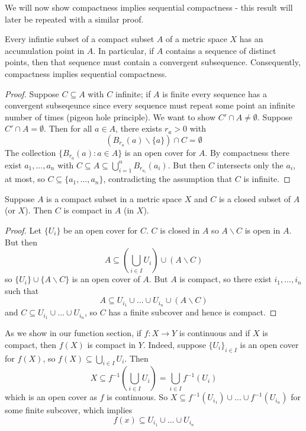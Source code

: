 We will now show compactness implies sequential compactness - this result will later be repeated with a similar proof.

\begin{proposition}
    Every infintie subset of a compact subset $A$ of a metric space $X$ has an accumulation point in $A$. In particular, if $A$ contains a sequence of distinct points, then that sequence must contain a convergent subsequence. Consequently, compactness implies sequential compactness.
\end{proposition}
\begin{proof}
    Suppose $C \subseteq A$ with $C$ infinite; if $A$ is finite every sequence has a convergent subseqeunce since every sequence must repeat some point an infinite number of times (pigeon hole principle). We want to show $C'\cap A \neq \emptyset$. Suppose $C'\cap A = \emptyset$. Then for all $a \in A$, there exists $r_a > 0$ with $$(B_{r_a}(a)\backslash\{a\})\cap C = \emptyset$$ The collection $\{B_{r_a}(a):a \in A\}$ is an open cover for $A$. By compactness there exist $a_1,...,a_n$ with $C \subseteq A \subseteq \bigcup_{i=1}^nB_{r_{a_i}}(a_i)$. But then $C$ intersects only the $a_i$, at most, so $C \subseteq \{a_1,...,a_n\}$, contradicting the assumption that $C$ is infinite.
\end{proof}

\begin{proposition}
    Suppose $A$ is a compact subset in a metric space $X$ and $C$ is a closed subset of $A$ (or $X$). Then $C$ is compact in $A$ (in $X$).
\end{proposition}
\begin{proof}
    Let $\{U_i\}$ be an open cover for $C$. $C$ is closed in $A$ so $A \backslash C$ is open in $A$. But then $$A \subseteq \left(\bigcup_{i \in I}U_i\right)\cup\left(A\backslash C\right)$$ so $\{U_i\}\cup\{A\backslash C\}$ is an open cover of $A$. But $A$ is compact, so there exist $i_1,...,i_n$ such that $$A \subseteq U_{i_1}\cup...\cup U_{i_n}\cup(A\backslash C)$$ and $C \subseteq U_{i_1}\cup ... \cup U_{i_n}$, so $C$ has a finite subcover and hence is compact.
\end{proof}

\begin{example}
    As we show in our function section, if $f:X\rightarrow Y$ is continuous and if $X$ is compact, then $f(X)$ is compact in $Y$. Indeed, suppose $\{U_i\}_{i \in I}$ is an open cover for $f(X)$, so $f(X) \subseteq \bigcup_{i \in I}U_i$. Then $$X \subseteq f^{-1}\left(\bigcup_{i \in I}U_i\right) = \bigcup_{i \in I}f^{-1}(U_i)$$ which is an open cover as $f$ is continuous. So $X \subseteq f^{-1}(U_{i_1})\cup...\cup f^{-1}(U_{i_n})$ for some finite subcover, which implies $$f(x) \subseteq U_{i_1}\cup...\cup U_{i_n}$$
\end{example}


